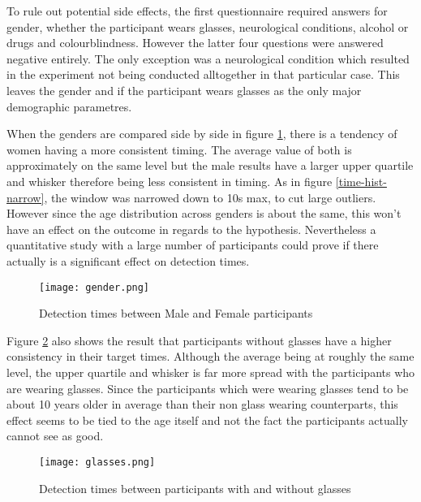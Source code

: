             To rule out potential side effects, the first questionnaire required answers for gender, whether the participant wears glasses, neurological conditions, alcohol or drugs and colourblindness. However the latter four questions were answered negative entirely. The only exception was a neurological condition which resulted in the experiment not being conducted alltogether in that particular case. This leaves the gender and if the participant wears glasses as the only major demographic parametres.
            
            When the genders are compared side by side in figure \ref*{gender}, there is a tendency of women having a more consistent timing. The average value of both is approximately on the same level but the male results have a larger upper quartile and whisker therefore being less consistent in timing. As in figure \ref*{time-hist-narrow}, the window was narrowed down to 10s max, to cut large outliers. However since the age distribution across genders is about the same, this won't have an effect on the outcome in regards to the hypothesis. Nevertheless a quantitative study with a large number of participants could prove if there actually is a significant effect on detection times.

            \begin{figure}[h]     %
                \centering
                \texttt{[image: gender.png]} 
                \caption{Detection times between Male and Female participants}\label{gender}
            \end{figure} 

            Figure \ref*{glasses} also shows the result that participants without glasses have a higher consistency in their target times. Although the average being at roughly the same level, the upper quartile and whisker is far more spread with the participants who are wearing glasses. Since the participants which were wearing glasses tend to be about 10 years older in average than their non glass wearing counterparts, this effect seems to be tied to the age itself and not the fact the participants actually cannot see as good.

            \begin{figure}[h]     %
                \centering
                \texttt{[image: glasses.png]} 
                \caption{Detection times between participants with and without glasses}\label{glasses}
            \end{figure}

